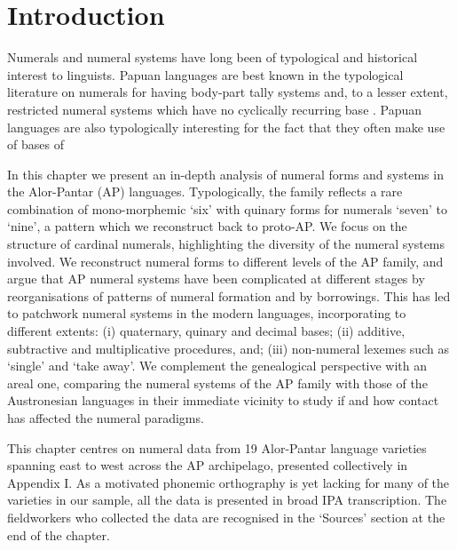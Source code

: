 
\renewcommand{\thesection}{\arabic{section}} 
 
\section{Introduction}

\hypertarget{Toc376958477}{}Numerals and numeral systems have long been of typological and historical interest to linguists. Papuan languages are best known in the typological literature on numerals for having body-part tally systems and, to a lesser extent, restricted numeral systems which have no cyclically recurring base{} \citep{Laycock1975,Lean1992,Comrie2005numsys}. Papuan languages are also typologically interesting for the fact that they often make use of bases of  

In this chapter we present an in-depth analysis of numeral forms and systems in the Alor-Pantar (AP) languages. Typologically, the family reflects a rare combination of mono-morphemic `six' with quinary forms for numerals `seven' to `nine', a pattern which we reconstruct back to proto-AP. We focus on the structure of cardinal numerals, highlighting the diversity of the numeral systems involved. We reconstruct numeral forms to different levels of the AP family, and argue that AP numeral systems have been complicated at different stages by reorganisations of patterns of numeral formation and by borrowings. This has led to patchwork numeral systems in the modern languages, incorporating to different extents: (i) quaternary, quinary and decimal bases; (ii) additive, subtractive and multiplicative procedures, and; (iii) non-numeral lexemes such as `single' and `take away'. We complement the genealogical perspective with an areal one, comparing the numeral systems of the AP family with those of the Austronesian languages in their immediate vicinity to study if and how contact has affected the numeral paradigms.

This chapter centres on numeral data from 19 Alor-Pantar language varieties spanning east to west across the AP archipelago, presented collectively in Appendix I. As a motivated phonemic orthography is yet lacking for many of the varieties in our sample, all the data is presented in broad IPA transcription. The fieldworkers who collected the data are recognised in the `Sources' section at the end of the chapter. 

